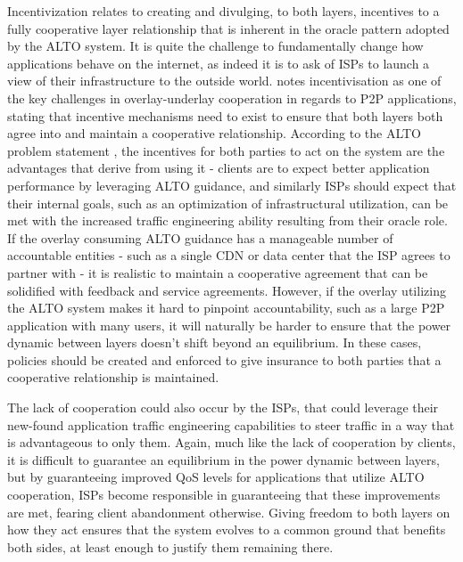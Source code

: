     Incentivization relates to creating and divulging, to both layers, incentives to a fully cooperative layer relationship that is inherent in the oracle pattern adopted by the ALTO system.
    It is quite the challenge to fundamentally change how applications behave on the internet, as indeed it is to ask of ISPs to launch a view of their infrastructure to the outside world.
    \cite{dan-Commag10} notes incentivisation as one of the key challenges in overlay-underlay cooperation in regards to P2P applications, stating that incentive mechanisms need to exist to ensure that both layers both agree into and maintain a cooperative relationship.
    According to the ALTO problem statement \cite{alto-problem-statement}, the incentives for both parties to act on the system are the advantages that derive from using it - clients are to expect better application performance by leveraging ALTO guidance, and similarly ISPs should expect that their internal goals, such as an optimization of infrastructural utilization, can be met with the increased traffic engineering ability resulting from their oracle role.
    If the overlay consuming ALTO guidance has a manageable number of accountable entities - such as a single CDN or data center that the ISP agrees to partner with - it is realistic to maintain a cooperative agreement that can be solidified with feedback and service agreements.
    However, if the overlay utilizing the ALTO system makes it hard to pinpoint accountability, such as a large P2P application with many users, it will naturally be harder to ensure that the power dynamic between layers doesn't shift beyond an equilibrium.
    In these cases, policies should be created and enforced to give insurance to both parties that a cooperative relationship is maintained.

    The lack of cooperation could also occur by the ISPs, that could leverage their new-found application traffic engineering capabilities to steer traffic in a way that is advantageous to only them.
    Again, much like the lack of cooperation by clients, it is difficult to guarantee an equilibrium in the power dynamic between layers, but by guaranteeing improved QoS levels for applications that utilize ALTO cooperation, ISPs become responsible in guaranteeing that these improvements are met, fearing client abandonment otherwise.
    Giving freedom to both layers on how they act ensures that the system evolves to a common ground that benefits both sides, at least enough to justify them remaining there.

